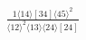 \documentclass[varwidth, border=5pt]{standalone}
\begin{document}
\begin{my}
$\begin{gathered}
\scriptscriptstyle\frac{1⟨14⟩[34]⟨45⟩^2}{⟨12⟩^2⟨13⟩⟨24⟩[24]}
\end{gathered}$
\end{my}
\end{document}
